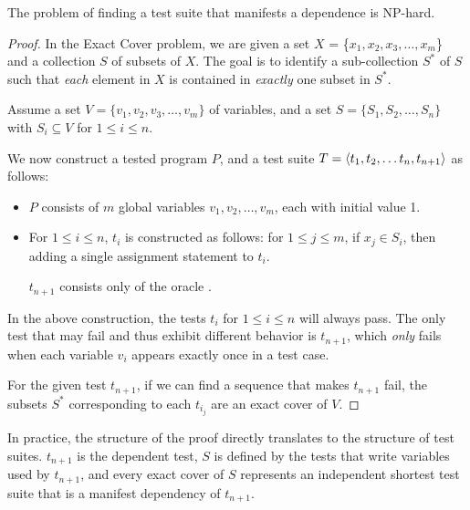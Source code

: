 \begin{theorem}
The problem of finding a test suite that manifests a dependence is
NP-hard.
\end{theorem}

\begin{proof}
In the Exact Cover problem,
we are given a set $X$ = \{$x_1, x_2, x_3, \dots, x_m$\} and a collection $S$ of subsets of $X$.
The goal is to identify a sub-collection $S^*$ of $S$ such that \textit{each}
element in $X$ is contained in \textit{exactly} one subset in $S^*$.  

Assume a set $V = \{v_1, v_2, v_3, \dots, v_m\}$ of variables,
and a set $S = \{S_1, S_2, \dots, S_n\}$ with $S_i \subseteq V$ for $ 1\leq i
\leq n$. 

We now construct a tested program $P$, and a test suite
$T =  \langle t_1, t_2, \dots t_n , t_{n+1} \rangle $ as follows:

\begin{itemize}

\item $P$ consists of $m$ global variables 
$v_1, v_2,\dots, v_m$, each with initial value 1.

\item 
For $1 \le i \le n$, $t_i$ is constructed as follows:
for $1 \le j \le m$, if $x_j \in S_i$, then adding a
single assignment statement  to $t_i$.

$t_{n+1}$ consists only of the oracle
.

\end{itemize}

In the above construction, the tests $t_i$ for $1 \le i \le n$ 
will always pass. The only
test that may fail and thus exhibit different behavior is $t_{n+1}$, which 
\emph{only} fails when each variable $v_i$ appears exactly
once in a test case.

For the given test $t_{n+1}$, if we can
find a sequence 
that makes $t_{n+1}$ fail, the subsets $S^*$ corresponding
to each $t_{i_j}$ are an exact cover of $V$.
\end{proof}

In practice, the structure of the proof directly translates to the
structure of test suites. $t_{n+1}$ is the dependent test, $S$ is
defined by the tests that write variables used by $t_{n+1}$, and every
exact cover of $S$ represents an independent shortest test suite that
is a manifest dependency of $t_{n+1}$.

